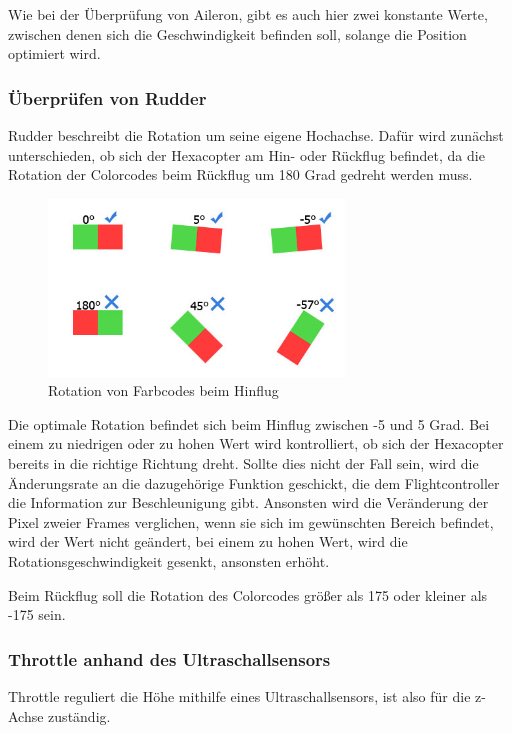     Wie bei der Überprüfung von Aileron, gibt es auch hier zwei konstante Werte, zwischen denen sich die Geschwindigkeit befinden soll, solange die Position optimiert wird.

    \subsubsection{Überprüfen von Rudder}
    Rudder beschreibt die Rotation um seine eigene Hochachse. Dafür wird zunächst unterschieden, ob sich der Hexacopter am Hin- oder Rückflug befindet, da die Rotation der Colorcodes beim Rückflug um 180 Grad gedreht werden muss.

    \begin{figure} [tbh]
      \begin{centering}
        \includegraphics[width = 0.7\textwidth]{Bilder/bor_rotation}
      \par\end{centering}
      \caption{Rotation von Farbcodes beim Hinflug}
      \label{Rotation_Farbcode}
    \end{figure}

    Die optimale Rotation befindet sich beim Hinflug zwischen -5 und 5 Grad.
    Bei einem zu niedrigen oder zu hohen Wert wird kontrolliert, ob sich der Hexacopter bereits in die richtige Richtung dreht.
    Sollte dies nicht der Fall sein, wird die Änderungsrate an die dazugehörige Funktion geschickt, die dem Flightcontroller die Information zur Beschleunigung gibt.
    Ansonsten wird die Veränderung der Pixel zweier Frames verglichen, wenn sie sich im gewünschten Bereich befindet, wird der Wert nicht geändert, bei einem zu hohen Wert, wird die Rotationsgeschwindigkeit gesenkt, ansonsten erhöht.

    Beim Rückflug soll die Rotation des Colorcodes größer als 175 oder kleiner als -175 sein.

    \subsubsection{Throttle anhand des Ultraschallsensors}
    Throttle reguliert die Höhe mithilfe eines Ultraschallsensors, ist also für die z-Achse zuständig.

